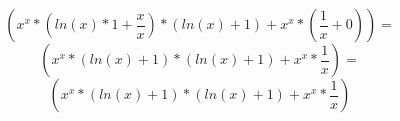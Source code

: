 \documentclass[a4paper,12pt]{article}
\begin{document}
\begin{equation}
\left( {{{{x }^ {x }}* {\left( {{ln \left( {x }\right) }* {1 }}+ {\frac{{x }}{{x }}}\right) }}* {\left( {ln \left( {x }\right) }+ {1 }\right) }}+ {{{x }^ {x }}* {\left( {\frac{{1 }}{{x }}}+ {0 }\right) }}\right) =
\end{equation}
\begin{equation}
\left( {{{{x }^ {x }}* {\left( {ln \left( {x }\right) }+ {1 }\right) }}* {\left( {ln \left( {x }\right) }+ {1 }\right) }}+ {{{x }^ {x }}* {\frac{{1 }}{{x }}}}\right) =
\end{equation}
\begin{equation}
\left( {{{{x }^ {x }}* {\left( {ln \left( {x }\right) }+ {1 }\right) }}* {\left( {ln \left( {x }\right) }+ {1 }\right) }}+ {{{x }^ {x }}* {\frac{{1 }}{{x }}}}\right) 
\end{equation}
\end{document}
